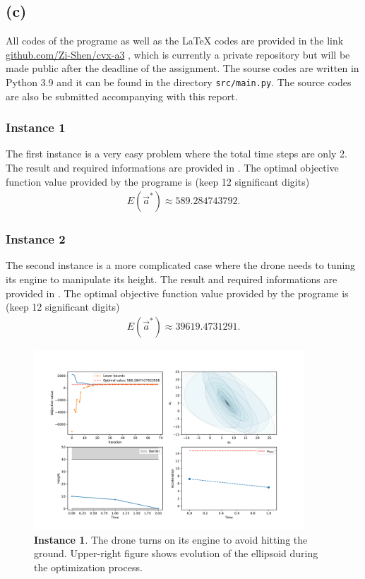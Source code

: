\documentclass[letterpaper,10pt]{article}
\begin{document}
\subsection{(c)}

All codes of the programe as well as the LaTeX codes are provided in the link \href{https://github.com/Zi-Shen/cvx-a3}{github.com/Zi-Shen/cvx-a3}
, which is currently a private repository but will be made public after the deadline of the assignment. The sourse codes are written in Python 3.9 and it can be found in the directory \texttt{src/main.py}. The source codes are also be submitted accompanying with this report.

\subsubsection*{Instance 1}

The first instance is a very easy problem where the total time steps are only 2. The result and required informations are provided in .
The optimal objective function value provided by the programe is (keep 12 significant digits)
\begin{align}
    E(\vec a^*)\approx 589.284743792.
\end{align}

\subsubsection*{Instance 2}

The second instance is a more complicated case where the drone needs to tuning its engine to manipulate its height. 
The result and required informations are provided in .
The optimal objective function value provided by the programe is (keep 12 significant digits)
\begin{align}
    E(\vec a^*)\approx 39619.4731291.
\end{align}

\begin{figure}
    \centering
    \includegraphics[width=0.9\textwidth]{fig/Figure_1.pdf}
    \caption{\textbf{Instance 1}. The drone turns on its engine to avoid hitting the ground. 
    Upper-right figure shows evolution of the ellipsoid during the optimization process.}
    \label{fig:instance1}
\end{figure}
\end{document}
